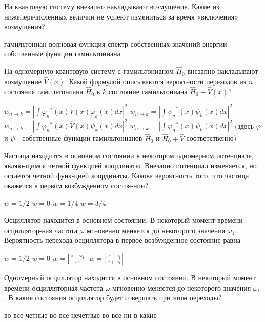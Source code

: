 \documentclass[11pt,a4paper]{exam}
\begin{document}
\begin{questions}
\question На квантовую систему внезапно накладывают возмущение. Какие из нижеперечисленных величин не успеют измениться за время «включения» возмущения?
\begin{choices}
\choice гамильтониан               
\choice волновая функция
\choice спектр собственных значений энергии    
\choice собственные функции гамильтониана
\end{choices}

\question На одномерную квантовую систему с гамильтонианом ${\hat H_0}$ внезапно накладывают возмущение $\hat V(x)$. Какой формулой описываются вероятности переходов из $n$ состояния гамильтониана ${\hat H_0}$ в $k$ состояние гамильтониана ${\hat H_0} + \hat V(x)$?
\begin{choices}
\choice ${w_{n \to k}} = {\left| {\int {{\varphi _n}^*(x)\hat V(x){\varphi _k}(x)dx} } \right|^2}$      
\choice ${w_{n \to k}} = {\left| {\int {{\psi _n}^*(x){\psi _k}(x)dx} } \right|^2}$
\choice ${w_{n \to k}} = {\left| {\int {{\varphi _n}^*(x)\hat V(x){\psi _k}(x)dx} } \right|^2}$      
\choice ${w_{n \to k}} = {\left| {\int {{\varphi _n}^*(x){\psi _k}(x)dx} } \right|^2}$ 
(здесь $\varphi $ и $\psi $ - собственные функции гамильтонианов ${\hat H_0}$ и ${\hat H_0} + \hat V$ соответственно)
\end{choices}

\question Частица находится в основном состоянии в некотором одномерном потенциале, являю-щимся четной функцией координаты. Внезапно потенциал изменяется, но остается четной функ-цией координаты. Какова вероятность того, что частица окажется в первом возбужденном состоя-нии?
\begin{choices}
\choice $w = 1/2$      
\choice $w = 0$     
\choice $w = 1/4$      
\choice $w = 3/4$
\end{choices}

\question Осциллятор находится в основном состоянии. В некоторый момент времени осциллятор-ная частота $\omega $ мгновенно меняется до некоторого значения ${\omega _1}$. Вероятность перехода осциллятора в первое возбужденное состояние равна
\begin{choices}
\choice $w = 1/2$      
\choice $w = 0$     
\choice $w = \left| {\frac{{\omega  - {\omega _1}}}{\omega }} \right|$    
\choice $w = \left| {\frac{{\omega  - {\omega _1}}}{{\omega  + {\omega _1}}}} \right|$
\end{choices}

\question Одномерный осциллятор находится в основном состоянии. В некоторый момент времени осцилляторная частота $\omega $ мгновенно меняется до некоторого значения ${\omega _1}$. В какие состояния осциллятор будет совершать при этом переходы?
\begin{choices}
\choice во все четные     
\choice во все нечетные
\choice во все         
\choice ни в какие 
\end{choices}


\end{questions}
\end{document}
